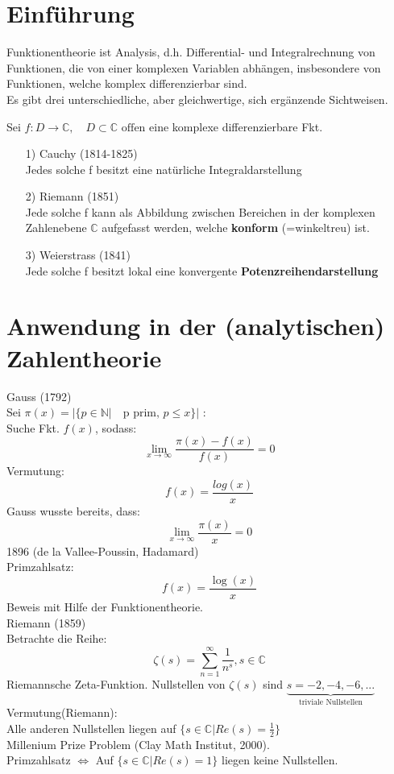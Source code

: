 \section{Einführung}
Funktionentheorie ist Analysis, d.h. Differential- und Integralrechnung von Funktionen, die von einer komplexen Variablen abhängen, insbesondere von Funktionen, welche komplex differenzierbar sind.\\
Es gibt drei unterschiedliche, aber gleichwertige, sich ergänzende Sichtweisen.

Sei
$f: D \to \mathds{C},\quad  D \subset \mathds{C} \text{ offen}$
eine komplexe differenzierbare Fkt.\\
\begin{itemize}
	\item[1)] Cauchy (1814-1825) \\
	Jedes solche f besitzt eine natürliche Integraldarstellung
	\item[2)] Riemann (1851) \\
	Jede solche f kann als Abbildung zwischen Bereichen in der komplexen Zahlenebene $\mathds{C}$ aufgefasst werden, welche \textbf{konform} (=winkeltreu) ist.
	\item[3)] Weierstrass (1841) \\
	Jede solche f besitzt lokal eine konvergente \textbf{Potenzreihendarstellung}
\end{itemize}


\section{Anwendung in der (analytischen) Zahlentheorie}

Gauss (1792)\\
Sei $\pi(x) = |\{p \in \mathds{N}|\quad \text{p prim, } p \leq x\}|$ :\\
Suche Fkt. $f(x)$, sodass:
\[
\lim_{x \to \infty} \frac{\pi(x)-f(x)}{f(x)} = 0
\]
Vermutung:
\[
f(x) = \frac{log(x)}{x}
\]
Gauss wusste bereits, dass:
\[
\lim_{x \to \infty} \frac{\pi(x)}{x} = 0
\]
1896 (de la Vallee-Poussin, Hadamard)\\
Primzahlsatz:
\[
f(x) = \frac{\log(x)}{x}
\]
Beweis mit Hilfe der Funktionentheorie.\\
Riemann (1859)\\
Betrachte die Reihe:
\[
\zeta (s) = \sum^{\infty}_{n=1} \frac{1}{n^s}, s \in \mathds{C}
\]
Riemannsche Zeta-Funktion. Nullstellen von $\zeta (s)$ sind $\underbrace{s=-2,-4,-6,...}_{\text{triviale Nullstellen}}$\\
Vermutung(Riemann):\\
Alle anderen Nullstellen liegen auf $\{s\in \mathds{C}| Re(s) = \frac{1}{2}\}$\\
Millenium Prize Problem (Clay Math Institut, 2000).\\
Primzahlsatz $\Leftrightarrow $ Auf $\{s\in \mathds{C}| Re(s) = 1\}$ liegen keine Nullstellen.